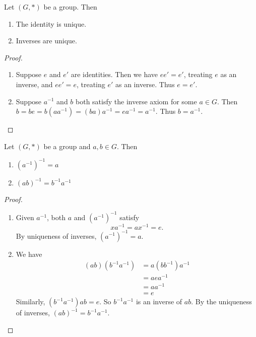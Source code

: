 \documentclass[a4paper]{article}
\begin{document}
\begin{prop}
  Let $(G, *)$ be a group. Then
  \begin{enumerate}
    \item The identity is unique.
    \item Inverses are unique.
  \end{enumerate}
\end{prop}
\begin{proof}\leavevmode
  \begin{enumerate}[label=(\roman{*})]
    \item Suppose $e$ and $e'$ are identities. Then we have $ee' = e'$, treating $e$ as an inverse, and $ee' = e$, treating $e'$ as an inverse. Thus $e = e'$.
    \item Suppose $a^{-1}$ and $b$ both satisfy the inverse axiom for some $a\in G$. Then $b = be = b(aa^{-1}) = (ba)a^{-1} = ea^{-1} = a^{-1}$. Thus $b = a^{-1}$.
  \end{enumerate}
\end{proof}
\begin{prop}
  Let $(G, *)$ be a group and $a, b\in G$. Then
  \begin{enumerate}
    \item $(a^{-1})^{-1} = a$
    \item $(ab)^{-1} = b^{-1}a^{-1}$
  \end{enumerate}
\end{prop}
\begin{proof}\leavevmode
  \begin{enumerate}
    \item Given $a^{-1}$, both $a$ and  $(a^{-1})^{-1}$ satisfy
      \[
        xa^{-1} = ax^{-1} = e.
      \]
      By uniqueness of inverses, $(a^{-1})^{-1} = a$.
    \item We have
      \begin{align*}
        (ab)(b^{-1}a^{-1}) &= a(bb^{-1})a^{-1} \\
        &= aea^{-1}\\
        &= aa^{-1}\\
        &= e
      \end{align*}
      Similarly, $(b^{-1}a^{-1})ab = e$. So $b^{-1}a^{-1}$ is an inverse of $ab$. By the uniqueness of inverses, $(ab)^{-1} = b^{-1}a^{-1}$.
  \end{enumerate}
\end{proof}
\end{document}

